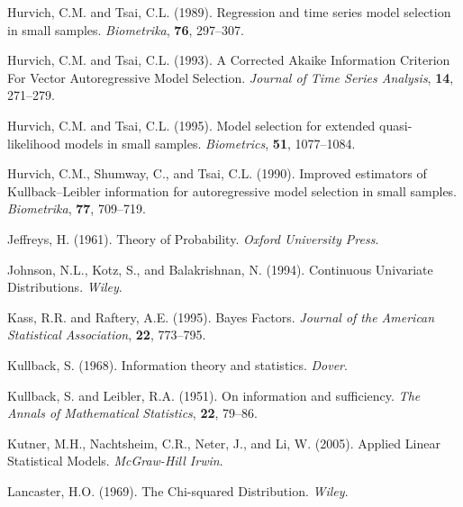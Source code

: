 \phantom{a}

\rff Hurvich, C.M. and Tsai, C.L. (1989).
      Regression and time series model selection in small samples.
      {\it Biometrika},
      {\bf 76}, {297--307}.

\phantom{a}

\rff Hurvich, C.M. and Tsai, C.L. (1993).
      A Corrected Akaike Information Criterion For Vector Autoregressive Model Selection.
      {\it Journal of Time Series Analysis},
      {\bf 14}, {271--279}.

\phantom{a}

\rff Hurvich, C.M. and Tsai, C.L. (1995).
      Model selection for extended quasi-likelihood models in small samples.
      {\it Biometrics},
      {\bf 51}, {1077--1084}.

\phantom{a}

\rff Hurvich, C.M., Shumway, C., and Tsai, C.L. (1990).
      Improved estimators of Kullback–Leibler information for autoregressive model selection in small samples.
      {\it Biometrika},
      {\bf 77}, {709--719}.

\phantom{a}

\rff Jeffreys, H. (1961).
      Theory of Probability.
      {\it Oxford University Press}.

\phantom{a}

\rff Johnson, N.L., Kotz, S., and Balakrishnan, N. (1994).
      Continuous Univariate Distributions.
      {\it Wiley}.

\phantom{a}

\rff Kass, R.R. and Raftery, A.E. (1995).
     Bayes Factors.
     {\it Journal of the American Statistical Association},
     {\bf 22}, {773--795}.

\phantom{a}

\rff Kullback, S. (1968).
      Information theory and statistics.
      {\it Dover}.

\phantom{a}

\rff Kullback, S. and Leibler, R.A. (1951).
     On information and sufficiency.
     {\it The Annals of Mathematical Statistics},
     {\bf 22}, {79--86}.

\phantom{a}

\rff Kutner, M.H., Nachtsheim, C.R., Neter, J., and Li, W. (2005).
      Applied Linear Statistical Models.
      {\it McGraw-Hill Irwin}.

\phantom{a}

\rff Lancaster, H.O. (1969).
      The Chi-squared Distribution.
     {\it Wiley}.

